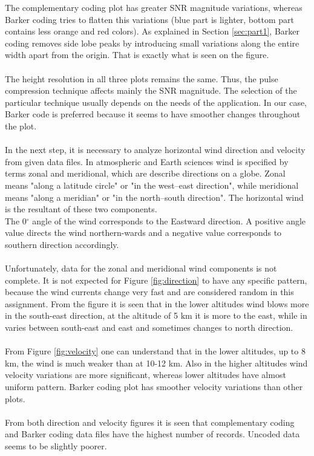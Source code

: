 \documentclass{article}
\begin{document}
The complementary coding plot has greater SNR magnitude variations, whereas Barker coding tries to flatten this variations (blue part is lighter, bottom part contains less orange and red colors). As explained in Section \ref{sec:part1}, Barker coding removes side lobe peaks by introducing small variations along the entire width apart from the origin. That is exactly what is seen on the figure.\\
\\
The height resolution in all three plots remains the same. Thus, the pulse compression technique affects mainly the SNR magnitude. The selection of the particular technique usually depends on the needs of the application. In our case, Barker code is preferred because it seems to have smoother changes throughout the plot.\\
\\
In the next step, it is necessary to analyze horizontal wind direction and velocity from given data files. In atmospheric and Earth sciences wind is specified by terms zonal and meridional, which are describe directions on a globe. Zonal means "along a latitude circle" or "in the west–east direction", while meridional means "along a meridian" or "in the north–south direction". The horizontal wind is the resultant of these two components. \cite{Wiki:2012zm}\\ The 0$^{\circ}$ angle of the wind corresponds to the Eastward direction. A positive angle value directs the wind northern-wards and a negative value corresponds to southern direction accordingly.\\
\\
Unfortunately, data for the zonal and meridional wind components is not complete. It is not expected for Figure \ref{fig:direction} to have any specific pattern, because the wind currents change very fast and are considered random in this assignment. From the figure it is seen that in the lower altitudes wind blows more in the south-east direction, at the altitude of 5 km it is more to the east, while in varies between south-east and east and sometimes changes to north direction.\\
\\
From Figure \ref{fig:velocity} one can understand that in the lower altitudes, up to 8 km, the wind is much weaker than at 10-12 km. Also in the higher altitudes wind velocity variations are more significant, whereas lower altitudes have almost uniform pattern. Barker coding plot has smoother velocity variations than other plots.\\
\\
From both direction and velocity figures it is seen that complementary coding and Barker coding data files have the highest number of records. Uncoded data seems to be slightly poorer.
\end{document}
